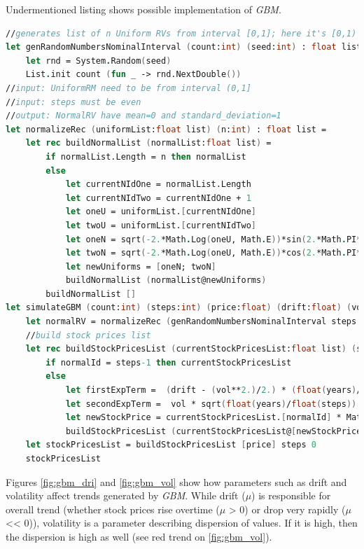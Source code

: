     Undermentioned listing shows possible implementation of \textit{GBM}.
    \begin{lstlisting}[language=FSharp, label={lst:gbm}, caption=F\# implementation of \textit{Geometric Brownian Motion}.]
//generates list of n Uniform RVs from interval [0,1]; here it's [0,1)
let genRandomNumbersNominalInterval (count:int) (seed:int) : float list =
    let rnd = System.Random(seed)
    List.init count (fun _ -> rnd.NextDouble())
//input: UniformRM need to be from interval (0,1]
//input: steps must be even
//output: NormalRV have mean=0 and standard_deviation=1
let normalizeRec (uniformList:float list) (n:int) : float list =
    let rec buildNormalList (normalList:float list) =
        if normalList.Length = n then normalList
        else
            let currentNIdOne = normalList.Length
            let currentNIdTwo = currentNIdOne + 1
            let oneU = uniformList.[currentNIdOne]
            let twoU = uniformList.[currentNIdTwo]
            let oneN = sqrt(-2.*Math.Log(oneU, Math.E))*sin(2.*Math.PI*twoU)
            let twoN = sqrt(-2.*Math.Log(oneU, Math.E))*cos(2.*Math.PI*twoU)
            let newUniforms = [oneN; twoN]
            buildNormalList (normalList@newUniforms)
        buildNormalList []
let simulateGBM (count:int) (steps:int) (price:float) (drift:float) (vol:float) (years:float) (seed:int) =
    let normalRV = normalizeRec (genRandomNumbersNominalInterval steps seed) steps
    //build stock prices list
    let rec buildStockPricesList (currentStockPricesList:float list) (steps:int) (normalId:int) : float list =
        if normalId = steps-1 then currentStockPricesList
        else
            let firstExpTerm =  (drift - (vol**2.)/2.) * (float(years)/float(steps))
            let secondExpTerm =  vol * sqrt(float(years)/float(steps)) * normalRV.[normalId]
            let newStockPrice = currentStockPricesList.[normalId] * Math.E ** (firstExpTerm + secondExpTerm)
            buildStockPricesList (currentStockPricesList@[newStockPrice]) steps (normalId+1)
    let stockPricesList = buildStockPricesList [price] steps 0
    stockPricesList
        \end{lstlisting}
    Figures \ref{fig:gbm_dri} and \ref{fig:gbm_vol} show how parameters such as drift and volatility affect trends generated by \textit{GBM}. While drift ($\mu$) is responsible for overall trend (whether stock prices rise overtime ($\mu$ > 0) or drop very rapidly ($\mu$ << 0)), volatility is a parameter describing dispersion of values. If it is high, then the dispersion is high as well (see red trend on \ref{fig:gbm_vol}).
